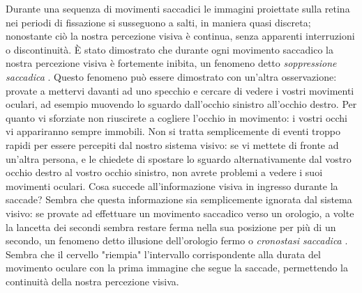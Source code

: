 \documentclass[12pt]{article}
\begin{document}
Durante una sequenza di movimenti saccadici le immagini proiettate sulla retina nei periodi di fissazione si susseguono a salti, in maniera quasi discreta; nonostante ciò la nostra percezione visiva è continua, senza apparenti interruzioni o discontinuità. È stato dimostrato che durante ogni movimento saccadico la nostra percezione visiva è fortemente inibita, un fenomeno detto \textit{soppressione saccadica} \cite{Volkmann1978}. Questo fenomeno può essere dimostrato con un'altra osservazione: provate a mettervi davanti ad uno specchio e cercare di vedere i vostri movimenti oculari, ad esempio muovendo lo sguardo dall'occhio sinistro all'occhio destro. Per quanto vi sforziate non riuscirete a cogliere l'occhio in movimento: i vostri occhi vi appariranno sempre immobili. Non si tratta semplicemente di eventi troppo rapidi per essere percepiti dal nostro sistema visivo: se vi mettete di fronte ad un'altra persona, e le chiedete di spostare lo sguardo alternativamente dal vostro occhio destro al vostro occhio sinistro, non avrete problemi a vedere i suoi movimenti oculari. Cosa succede all'informazione visiva in ingresso durante la saccade? Sembra che questa informazione sia semplicemente ignorata dal sistema visivo: se provate ad effettuare un movimento saccadico verso un orologio, a volte la lancetta dei secondi sembra restare ferma nella sua posizione per più di un secondo, un fenomeno detto illusione dell'orologio fermo o \textit{cronostasi saccadica} \cite{Yarrow2001}. Sembra che il cervello "riempia" l'intervallo corrispondente alla durata del movimento oculare con la prima immagine che segue la saccade, permettendo la continuità della nostra percezione visiva. 
\end{document}
